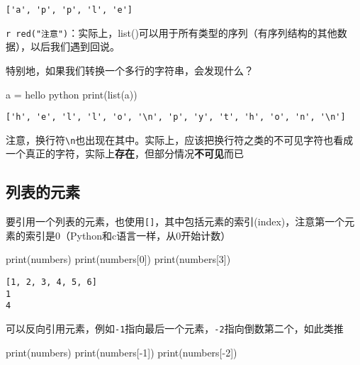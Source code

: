 \documentclass[
  letterpaper,
  DIV=11,
  numbers=noendperiod]{scrreprt}
\newenvironment{Shaded}{\begin{snugshade}}{\end{snugshade}}
\newcommand{\BuiltInTok}[1]{\textcolor[rgb]{0.00,0.23,0.31}{#1}}
\newcommand{\DecValTok}[1]{\textcolor[rgb]{0.68,0.00,0.00}{#1}}
\newcommand{\NormalTok}[1]{\textcolor[rgb]{0.00,0.23,0.31}{#1}}
\newcommand{\OperatorTok}[1]{\textcolor[rgb]{0.37,0.37,0.37}{#1}}
\newcommand{\StringTok}[1]{\textcolor[rgb]{0.13,0.47,0.30}{#1}}
\begin{document}
\begin{verbatim}
['a', 'p', 'p', 'l', 'e']
\end{verbatim}

\texttt{r\ red("注意")}：实际上，list()可以用于所有类型的序列（有序列结构的其他数据），以后我们遇到回说。

特别地，如果我们转换一个多行的字符串，会发现什么？

\begin{Shaded}
\begin{Highlighting}[]
\NormalTok{a }\OperatorTok{=} \StringTok{\textquotesingle{}\textquotesingle{}\textquotesingle{}hello}
\StringTok{python}
\StringTok{\textquotesingle{}\textquotesingle{}\textquotesingle{}}
\BuiltInTok{print}\NormalTok{(}\BuiltInTok{list}\NormalTok{(a))}
\end{Highlighting}
\end{Shaded}

\begin{verbatim}
['h', 'e', 'l', 'l', 'o', '\n', 'p', 'y', 't', 'h', 'o', 'n', '\n']
\end{verbatim}

注意，换行符\texttt{\textbackslash{}n}也出现在其中。实际上，应该把换行符之类的不可见字符也看成一个真正的字符，实际上\textbf{存在}，但部分情况\textbf{不可见}而已

\hypertarget{ux5217ux8868ux7684ux5143ux7d20}{%
\subsection{列表的元素}\label{ux5217ux8868ux7684ux5143ux7d20}}

要引用一个列表的元素，也使用\texttt{{[}{]}}，其中包括元素的索引(index)，注意第一个元素的索引是0（Python和c语言一样，从0开始计数）

\begin{Shaded}
\begin{Highlighting}[]
\BuiltInTok{print}\NormalTok{(numbers)}
\BuiltInTok{print}\NormalTok{(numbers[}\DecValTok{0}\NormalTok{])}
\BuiltInTok{print}\NormalTok{(numbers[}\DecValTok{3}\NormalTok{])}
\end{Highlighting}
\end{Shaded}

\begin{verbatim}
[1, 2, 3, 4, 5, 6]
1
4
\end{verbatim}

可以反向引用元素，例如\texttt{-1}指向最后一个元素，\texttt{-2}指向倒数第二个，如此类推

\begin{Shaded}
\begin{Highlighting}[]
\BuiltInTok{print}\NormalTok{(numbers)}
\BuiltInTok{print}\NormalTok{(numbers[}\OperatorTok{{-}}\DecValTok{1}\NormalTok{])}
\BuiltInTok{print}\NormalTok{(numbers[}\OperatorTok{{-}}\DecValTok{2}\NormalTok{])}
\end{Highlighting}
\end{Shaded}
\end{document}
